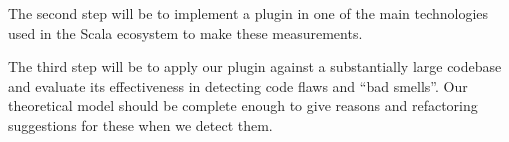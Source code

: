 \documentclass{article}
\begin{document}
The second step will be to implement a plugin in one of the main technologies used in the Scala ecosystem to make these measurements.\par

The third step will be to apply our plugin against a substantially large codebase and evaluate its effectiveness in detecting code flaws and ``bad smells''. Our theoretical model should be complete enough to give reasons and refactoring suggestions for these when we detect them.



\newpage


 

\end{document}
